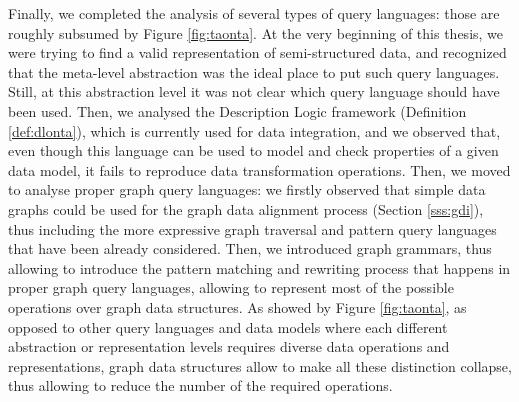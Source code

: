 Finally, we completed the analysis of several types of query languages: those are roughly subsumed by Figure \ref{fig:taonta}. At the very beginning of this thesis, we were trying to find a valid  representation of semi-structured data, and recognized that the meta-level abstraction  was the ideal place to put such query languages. Still, at this abstraction level it was not clear which query language should have been used. Then, we analysed the Description Logic framework (Definition \vref{def:dlonta}), which is currently used for data integration, and we observed that, even though this language can be used to model and check properties of a given data model, it fails to reproduce data transformation operations. Then, we moved to analyse proper graph query languages: we firstly observed that simple data graphs could be used for the graph data alignment process (Section \vref{sss:gdi}), thus including the more expressive graph traversal and pattern query languages that have been already considered. Then, we introduced graph grammars, thus allowing to introduce the pattern matching and rewriting process that happens in proper graph query languages, allowing to represent most of the possible operations over graph data structures. As showed by Figure \ref{fig:taonta}, as opposed to other query languages and data models where each different abstraction or representation levels requires diverse data operations and representations, graph data structures allow to make all these distinction collapse, thus allowing to reduce the number of the required operations.
